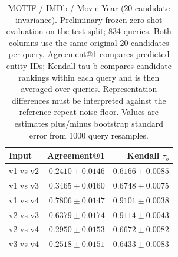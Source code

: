 \begin{table}[t]
\centering
\small
\begin{tabular}{lrr}
\toprule
Input & Agreement@1 & Kendall $\tau_b$ \\
\midrule
v1 vs v2 & $0.2410 \pm 0.0146$ & $0.6166 \pm 0.0085$ \\
v1 vs v3 & $0.3465 \pm 0.0160$ & $0.6748 \pm 0.0075$ \\
v1 vs v4 & $0.7806 \pm 0.0147$ & $0.9101 \pm 0.0038$ \\
v2 vs v3 & $0.6379 \pm 0.0174$ & $0.9114 \pm 0.0043$ \\
v2 vs v4 & $0.2950 \pm 0.0153$ & $0.6672 \pm 0.0082$ \\
v3 vs v4 & $0.2518 \pm 0.0151$ & $0.6433 \pm 0.0083$ \\
\bottomrule
\end{tabular}
\caption{MOTIF / IMDb / Movie-Year (20-candidate invariance). Preliminary frozen zero-shot evaluation on the test split; 834 queries. Both columns use the same original 20 candidates per query. Agreement@1 compares predicted entity IDs; Kendall tau-b compares candidate rankings within each query and is then averaged over queries. Representation differences must be interpreted against the reference-repeat noise floor. Values are estimates plus/minus bootstrap standard error from 1000 query resamples.}
\label{tab:motif-movie_year-invariance}
\end{table}
